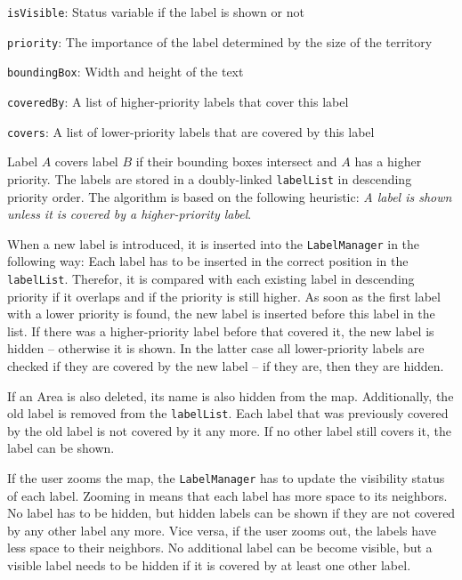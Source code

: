 \begin{compactitem}
  \item \texttt{isVisible}: Status variable if the label is shown or not
  \item \texttt{priority}: The importance of the label determined by the size of the territory
  \item \texttt{boundingBox}: Width and height of the text
  \item \texttt{coveredBy}: A list of higher-priority labels that cover this label
  \item \texttt{covers}: A list of lower-priority labels that are covered by this label
\end{compactitem}

Label $A$ covers label $B$ if their bounding boxes intersect and $A$ has a higher priority. The labels are stored in a doubly-linked \texttt{labelList} in descending priority order. The algorithm is based on the following heuristic: \emph{A label is shown unless it is covered by a higher-priority label}.

When a new label is introduced, it is inserted into the \texttt{LabelManager} in the following way:
Each label has to be inserted in the correct position in the \texttt{labelList}. Therefor, it is compared with each existing label in descending priority if it overlaps and if the priority is still higher.
As soon as the first label with a lower priority is found, the new label is inserted before this label in the list. If there was a higher-priority label before that covered it, the new label is hidden -- otherwise it is shown. In the latter case all lower-priority labels are checked if they are covered by the new label -- if they are, then they are hidden.

If an Area is also deleted, its name is also hidden from the map. Additionally, the old label is removed from the \texttt{labelList}. Each label that was previously covered by the old label is not covered by it any more. If no other label still covers it, the label can be shown.

If the user zooms the map, the \texttt{LabelManager} has to update the visibility status of each label. Zooming in  means that each label has more space to its neighbors. No label has to be hidden, but hidden labels can be shown if they are not covered by any other label any more. Vice versa, if the user zooms out, the labels have less space to their neighbors. No additional label can be become visible, but a visible label needs to be hidden if it is covered by at least one other label.

